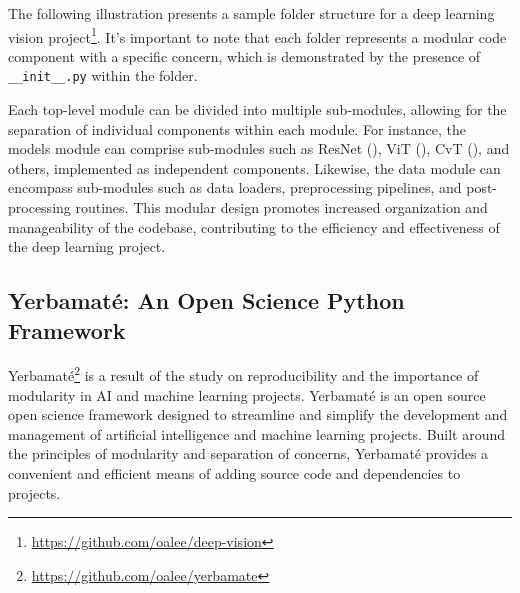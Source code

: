 The following illustration presents a sample folder structure for a deep learning vision project\footnote{ \url{https://github.com/oalee/deep-vision}}. It's important to note that each folder represents a modular code component with a specific concern, which is demonstrated by the presence of \verb|__init__.py| within the folder.

\vspace{2em}
Each top-level module can be divided into multiple sub-modules, allowing for the separation of individual components within each module. For instance, the models module can comprise sub-modules such as ResNet (\cite{resnet}), ViT (\cite{dosovitskiy2020vit}), CvT (\cite{wu2021cvt}), and others, implemented as independent components. Likewise, the data module can encompass sub-modules such as data loaders, preprocessing pipelines, and post-processing routines. This modular design promotes increased organization and manageability of the codebase, contributing to the efficiency and effectiveness of the deep learning project.


\subsection{Yerbamaté: An Open Science Python Framework}
Yerbamaté\footnote{\url{https://github.com/oalee/yerbamate}} is a result of the study on reproducibility and the importance of modularity in AI and machine learning projects. Yerbamaté is an open source open science framework designed to streamline and simplify the development and management of artificial intelligence and machine learning projects. Built around the principles of modularity and separation of concerns, Yerbamaté provides a convenient and efficient means of adding source code and dependencies to projects.

